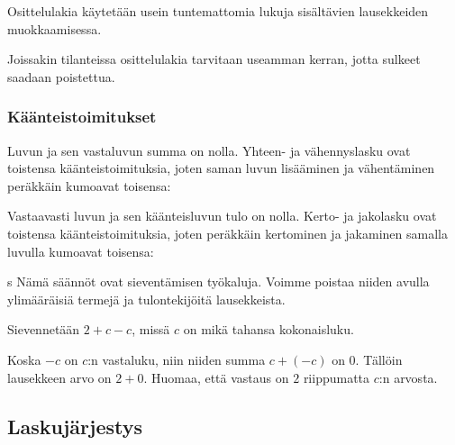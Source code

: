 Osittelulakia käytetään usein tuntemattomia lukuja sisältävien lausekkeiden muokkaamisessa.

\begin{esimerkki}
\end{esimerkki}

Joissakin tilanteissa osittelulakia tarvitaan useamman kerran, jotta sulkeet saadaan poistettua.

%


\subsubsection*{Käänteistoimitukset} %

Luvun ja sen vastaluvun summa on nolla. Yhteen- ja vähennyslasku ovat toistensa käänteistoimituksia, joten saman luvun lisääminen ja vähentäminen peräkkäin kumoavat toisensa:


Vastaavasti luvun ja sen käänteisluvun tulo on nolla. Kerto- ja jakolasku ovat toistensa käänteistoimituksia, joten peräkkäin kertominen ja jakaminen samalla luvulla kumoavat toisensa:

s
Nämä säännöt ovat sieventämisen työkaluja. Voimme poistaa niiden avulla ylimääräisiä termejä ja tulontekijöitä lausekkeista.

\begin{esimerkki} 
    Sievennetään $2+c-c$, missä $c$ on mikä tahansa kokonaisluku.\vspace*{11pt}
   
    Koska $-c$ on $c$:n vastaluku, niin niiden summa $c+(-c)$ on $0$. Tällöin lausekkeen arvo on $2+0$. Huomaa, että vastaus on $2$ riippumatta $c$:n arvosta.
\end{esimerkki}

\subsection{Laskujärjestys}

